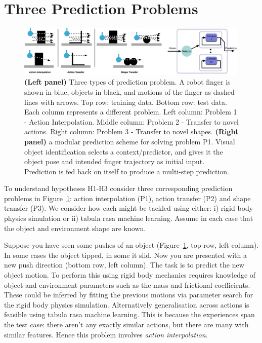 \section{Three Prediction Problems	}
\label{sec:schema}

\begin{figure}[t]
\centerline{\includegraphics[width=0.99\textwidth]{three-prediction-problems-1}}
\caption{{\bf (Left panel)} Three types of prediction problem. A robot finger is shown in blue, objects in black, and motions of the finger as dashed lines with arrows. Top row: training data. Bottom row: test data. Each column represents a different problem. Left column: Problem 1 - Action Interpolation. Middle column: Problem 2 - Transfer to novel actions. Right column: Problem 3 - Transfer to novel shapes. {\bf (Right panel)} a modular prediction scheme for solving problem P1. Visual object identification selects a context/predictor, and gives it the object pose and intended finger trajectory as initial input. Prediction is fed back on itself to produce a multi-step prediction.}
\label{fig:three-prediction-problems}
\end{figure}

To understand hypotheses H1-H3 consider three corresponding prediction problems in Figure~\ref{fig:three-prediction-problems}: action interpolation (P1), action transfer (P2) and shape transfer (P3). We consider how each might be tackled using either: i) rigid body physics simulation or ii) tabula rasa machine learning. Assume in each case that the object and environment shape are known.

 Suppose you have seen some pushes of an object (Figure~\ref{fig:three-prediction-problems}, top row, left column). In some cases the object tipped, in some it slid. Now you are presented with a new push direction (bottom row, left column). The task is to predict the new object motion. To perform this using rigid body mechanics requires knowledge of object and environment parameters such as the mass and frictional coefficients. These could be inferred by fitting the previous motions via parameter search for the rigid body physics simulation. Alternatively generalisation across actions is feasible using tabula rasa machine learning. This is because the experiences span the test case: there aren't any exactly similar actions, but there are many with similar features. Hence this problem involves {\em action interpolation}.

